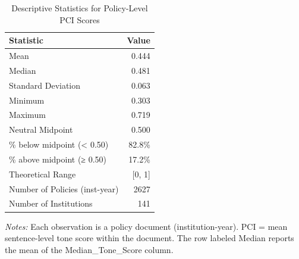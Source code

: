 \begin{table}[H]
\centering
\caption{Descriptive Statistics for Policy-Level PCI Scores}
\label{tab:table5_pci_stats}
\begin{threeparttable}
\small
\begin{tabular}{lr}
\toprule
\textbf{Statistic} & \textbf{Value} \\
\midrule
Mean & 0.444 \\
Median & 0.481 \\
Standard Deviation & 0.063 \\
Minimum & 0.303 \\
Maximum & 0.719 \\
Neutral Midpoint & 0.500 \\
\% below midpoint (< 0.50) & 82.8\% \\
\% above midpoint (≥ 0.50) & 17.2\% \\
Theoretical Range & [0, 1] \\
Number of Policies (inst-year) & 2627 \\
Number of Institutions & 141 \\
\bottomrule
\end{tabular}
\begin{tablenotes}\small
\item \textit{Notes:} Each observation is a policy document (institution-year). PCI = mean sentence-level tone score within the document. The row labeled Median reports the mean of the Median_Tone_Score column.
\end{tablenotes}
\end{threeparttable}
\end{table}